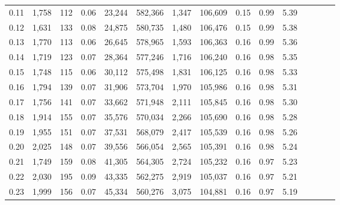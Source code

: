 \begin{tabular}{rrrcrrrrrrrrrrr}
0.11 &   1,758 &    112 &                                       0.06 &   23,244 &  582,366 &    1,347 &  106,609 &  0.15 &  0.99 &                         5.39 \\
0.12 &   1,631 &    133 &                                       0.08 &   24,875 &  580,735 &    1,480 &  106,476 &  0.15 &  0.99 &                         5.38 \\
0.13 &   1,770 &    113 &                                       0.06 &   26,645 &  578,965 &    1,593 &  106,363 &  0.16 &  0.99 &                         5.36 \\
0.14 &   1,719 &    123 &                                       0.07 &   28,364 &  577,246 &    1,716 &  106,240 &  0.16 &  0.98 &                         5.35 \\
0.15 &   1,748 &    115 &                                       0.06 &   30,112 &  575,498 &    1,831 &  106,125 &  0.16 &  0.98 &                         5.33 \\
0.16 &   1,794 &    139 &                                       0.07 &   31,906 &  573,704 &    1,970 &  105,986 &  0.16 &  0.98 &                         5.31 \\
0.17 &   1,756 &    141 &                                       0.07 &   33,662 &  571,948 &    2,111 &  105,845 &  0.16 &  0.98 &                         5.30 \\
0.18 &   1,914 &    155 &                                       0.07 &   35,576 &  570,034 &    2,266 &  105,690 &  0.16 &  0.98 &                         5.28 \\
0.19 &   1,955 &    151 &                                       0.07 &   37,531 &  568,079 &    2,417 &  105,539 &  0.16 &  0.98 &                         5.26 \\
0.20 &   2,025 &    148 &                                       0.07 &   39,556 &  566,054 &    2,565 &  105,391 &  0.16 &  0.98 &                         5.24 \\
0.21 &   1,749 &    159 &                                       0.08 &   41,305 &  564,305 &    2,724 &  105,232 &  0.16 &  0.97 &                         5.23 \\
0.22 &   2,030 &    195 &                                       0.09 &   43,335 &  562,275 &    2,919 &  105,037 &  0.16 &  0.97 &                         5.21 \\
0.23 &   1,999 &    156 &                                       0.07 &   45,334 &  560,276 &    3,075 &  104,881 &  0.16 &  0.97 &                         5.19 \\

\end{tabular}
